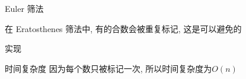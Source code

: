 \begin{frame}{Euler 筛法}
	\label{prime:algo:prime-seive-euler}

	在 Eratosthenes 筛法中, 有的合数会被重复标记, 这是可以避免的
\end{frame}


\begin{frame}{实现}
\end{frame}


\begin{frame}{时间复杂度}
	因为每个数只被标记一次, 所以时间复杂度为\(O(n)\)
\end{frame}
